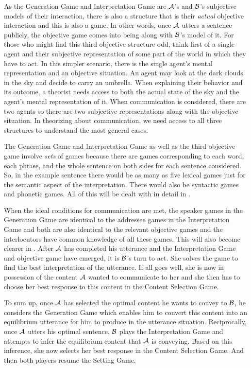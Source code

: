 As the Generation Game and Interpretation Game are $\cal A$'s and $\cal B$'s subjective models of their interaction, there is also a structure that is their \emph{actual} objective interaction and this is also a game. In other words, once $\cal A$ utters a sentence publicly, the objective game comes into being along with $\cal B$'s model of it. For those who might find this third objective structure odd, think first of a single agent and their subjective representation of some part of the world in which they have to act. In this simpler scenario, there is the single agent's mental representation and an objective situation. An agent may look at the dark clouds in the sky and decide to carry an umbrella. When explaining their behavior and its outcome, a theorist needs access to both the actual state of the sky and the agent's mental representation of it. When communication is considered, there are two agents so there are two subjective representations along with the objective situation. In theorizing about communication, we need access to all three structures to understand the most general cases.

The Generation Game and Interpretation Game as well as the third objective game involve \emph{sets} of games because there are games corresponding to each word, each phrase, and the whole sentence on both sides for each sentence considered. So, in the example sentence  there would be as many as five lexical games just for the semantic aspect of the interpretation. There would also be syntactic games and phonetic games. All of this will be dealt with in detail in .

When the ideal conditions for communication are met, the speaker games in the Generation Game are identical to the addressee games in the Interpretation Game and both are also identical to the relevant objective games and the interlocutors have common knowledge of all these games. This will also become clearer in . After $\cal A$ has completed his utterance and the Interpretation Game and objective game have emerged, it is $\cal B$'s turn to act. She solves the game to find the best interpretation of the utterance. If all goes well, she is now in possession of the content $\cal A$ wanted to communicate to her and she then has to choose her best response to this content in the Content Selection Game.

To sum up, once $\cal A$ has selected the optimal content he wants to convey to $\cal B$, he considers the Generation Game which enables him to convert this content into an equilibrium utterance for him to produce in the utterance situation. Reciprocally, once $\cal A$ utters his optimal sentence, $\cal B$ plays the Interpretation Game and attempts to infer the equilibrium content that $\cal A$ is conveying. Based on this inference, she now selects her best response in the Content Selection Game. And then both players resume the Setting Game.

